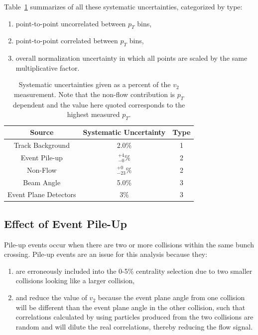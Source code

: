 Table~\ref{t:sys} summarizes of all these systematic
uncertainties, categorized by type:
\begin{enumerate}
\item point-to-point uncorrelated between $p_T$ bins,
\item point-to-point correlated between $p_T$ bins,
\item overall normalization uncertainty in which all points are scaled by the same multiplicative factor.
\end{enumerate}

\begin{table}[!h]
  \begin{center}
  \caption{\label{t:sys}Systematic uncertainties given as a percent of the $v_2$ measurement. Note that the non-flow contribution is $p_T$ dependent and the value here quoted corresponds to the highest measured $p_T$.}
    \begin{tabular}{ccc}
      \hline
      \hline
      Source& Systematic Uncertainty & Type \\ \hline
      Track Background &2.0\%& 1\\ 
      Event Pile-up    &$^{+4}_{-0}\%$& 2\\
      Non-Flow    &$^{+0}_{-23}\%$& 2\\
      Beam Angle &5.0\%& 3\\  
      Event Plane Detectors & 3\% & 3\\
    \hline
    \hline
    \end{tabular}
   \end{center}
 \end{table}

\subsection{Effect of Event Pile-Up}
Pile-up events occur when there are two or more collisions within the same bunch crossing. Pile-up events are an issue for this analysis because they:

\begin{enumerate}
\item are erroneously included into the 0-5\% centrality selection due to two smaller collisions looking like a larger collision,
\item and reduce the value of $v_2$ because the event plane angle from one collision will be different than the event plane angle in the other collision, such that correlations calculated by using particles produced from the two collisions are random and will dilute the real correlations, thereby reducing the flow signal.
\end{enumerate}

